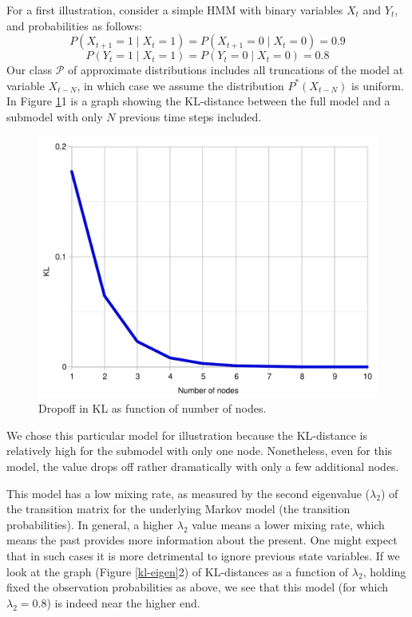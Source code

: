 \documentclass[10pt,letterpaper]{article}
\begin{document}
For a first illustration, consider a simple HMM with binary variables $X_t$ and $Y_t$, and probabilities as follows:
$$P(X_{t+1}=1\mid X_t=1) = P(X_{t+1}=0\mid X_t=0) = 0.9$$
$$P(Y_{t}=1\mid X_t=1) = P(Y_{t}=0\mid X_t=0) = 0.8$$
Our class $\mathcal{P}$ of approximate distributions includes all truncations of the model at variable $X_{t-N}$, in which case we assume the distribution $P^{*}(X_{t-N})$ is uniform. In Figure \ref{hmm}1 is a graph showing the KL-distance between the full model and a submodel with only $N$ previous time steps included.
 \begin{figure}[h]  \begin{center}
\includegraphics[scale=0.29]{hmm1.pdf} \caption{Dropoff in KL as function of number of nodes.} \end{center} 
\label{hmm}\end{figure} 
We chose this particular model for illustration because the KL-distance is relatively high for the submodel with only one node. Nonetheless, even for this model, the value drops off rather dramatically with only a few additional nodes.

This model has a low mixing rate, as measured by the second eigenvalue ($\lambda_2$) of the transition matrix for the underlying Markov model (the transition probabilities). In general, a higher $\lambda_2$ value means a lower mixing rate, which means the past provides more information about the present. One might expect that in such cases it is more detrimental to ignore previous state variables. If we look at the graph (Figure \ref{kl-eigen}2) of KL-distances as a function of $\lambda_2$, holding fixed the observation probabilities as above, we see that this model (for which $\lambda_2 = 0.8$) is indeed near the higher end.
\end{document}
